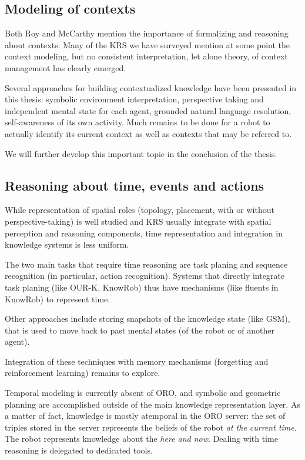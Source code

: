 \subsection{Modeling of contexts}

Both Roy and McCarthy mention the importance of formalizing and reasoning about
contexts. Many of the KRS we have surveyed mention at some point the context
modeling, but no consistent interpretation, let alone theory, of context
management has clearly emerged.

Several approaches for building contextualized knowledge have been presented in
this thesis: symbolic environment interpretation, perspective taking and
independent mental state for each agent, grounded natural language resolution,
self-awareness of its own activity. Much remains to be done for a robot to
actually identify its current context as well as contexts that may be referred
to.

We will further develop this important topic in the conclusion of the thesis.

\subsection{Reasoning about time, events and actions}

While representation of spatial roles (topology, placement, with or without
perspective-taking) is well studied and KRS usually integrate with spatial
perception and reasoning components, time representation and integration in
knowledge systems is less uniform.

The two main tasks that require time reasoning are task planing and sequence
recognition (in particular, action recognition). Systems that directly
integrate task planing (like OUR-K, {\sc KnowRob}) thus have mechanisms (like
fluents in {\sc KnowRob}) to represent time.

Other approaches include storing snapshots of the knowledge state (like GSM),
that is used to move back to past mental states (of the robot or of another
agent).

Integration of these techniques with memory mechanisms (forgetting and
reinforcement learning) remains to explore.

Temporal modeling is currently absent of ORO, and symbolic and geometric
planning are accomplished outside of the main knowledge representation
layer. As a matter of fact, knowledge is mostly atemporal in the ORO server: the
set of triples stored in the server represents the beliefs of the robot
\emph{at the current time}. The robot represents knowledge about the \emph{here
and now}. Dealing with time reasoning is delegated to dedicated tools.

